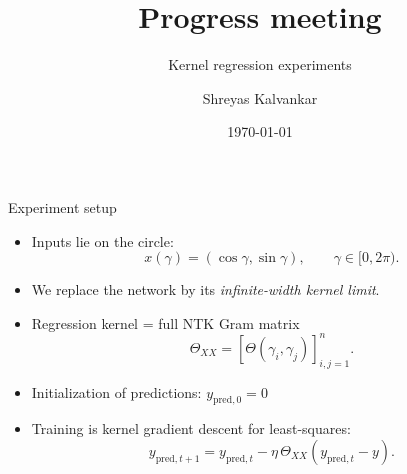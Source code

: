 \documentclass[10pt,aspectratio=169]{beamer}
\title{Progress meeting}
\subtitle{Kernel regression experiments}
\author{Shreyas Kalvankar}
\institute{TU Delft}
\date{\today}
\begin{document}
\maketitle

\begin{frame}{Experiment setup}
	\small
	\begin{itemize}
		\item Inputs lie on the circle:
		      \[
			      x(\gamma) = (\cos\gamma,\sin\gamma), \qquad \gamma \in [0,2\pi).
		      \]
		\item We replace the network by its \emph{infinite-width kernel limit}.
		\item Regression kernel = full NTK Gram matrix
		      \[
			      \Theta_{XX} = [\Theta(\gamma_i,\gamma_j)]_{i,j=1}^n.
		      \]

		\item Initialization of predictions: $y_{\mathrm{pred},0} = 0$

		\item Training is kernel gradient descent for least-squares:
		      \[
			      y_{\mathrm{pred},t+1}
			      =
			      y_{\mathrm{pred},t}
			      -
			      \eta\,\Theta_{XX}(y_{\mathrm{pred},t}-y).
		      \]
	\end{itemize}

\end{frame}
\end{document}
